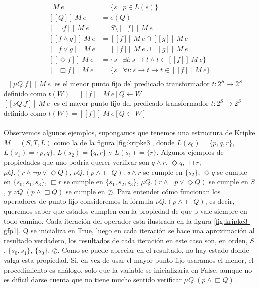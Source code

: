 \begin{align*}
 [[p]]\ M\ e &= \{s \mid p \in L(s)\}  \\
 [[Q]]\ M\ e &= e(Q) \\
 [[\neg f]]\ M\ e &= S \setminus [[f]]\ M\ e \\
 [[f \land g]]\ M\ e &= [[f]]\ M\ e \cap [[g]]\ M\ e \\
 [[f \lor g]]\ M\ e &= [[f]]\ M\ e \cup [[g]]\ M\ e \\
 [[\Diamond f]]\ M\ e &= \{s \mid \exists t : s \to t \land t \in [[f]]\ M\ e\} \\
 [[\Box f]]\ M\ e &= \{s \mid \forall t : s \to t  \rightarrow t \in [[f]]\ M\ e\} \\
\end{align*}
$[[\mu Q. f]] \ M\ e\ $ es el menor punto fijo del predicado transformador $t:2^{S} \to 2^{S}$ definido como $t(W) = [[f]]\ M\ e[Q \gets W] $ \\
$[[\nu Q. f]] \ M\ e\ $ es el mayor punto fijo del predicado transformador $t:2^{S} \to 2^{S}$ definido como $t(W) = [[f]]\ M\ e[Q \gets W] $ \\
\\
Observemos algunos ejemplos, supongamos que tenemos una estructura de Kripke $M = (S,T,L)$ como la de la figura \ref{fig:kripke3}, donde $L(s_{0}) = \{p,q,r\}$, $L(s_{1}) = \{p,q\}$, $L(s_{2}) = \{q,r\}$ y $L(s_{3}) = \{r\}$. Algunos ejemplos de propiedades que uno podria querer verificar son $q \land r$, $\Diamond q$, $\Box r$, $\mu Q. (r \land \neg p \lor \Diamond Q)$, $\nu Q. (p \land \Box Q)$. $q \land r$ se cumple en $\{s_{2}\}$, $\Diamond q$ se cumple en $\{s_{0},s_{1},s_{3}\}$, $\Box r$ se cumple en $\{s_{1},s_{2},s_{3}\}$, $\mu Q. (r \land \neg p \lor \Diamond Q)$ se cumple en $S$, y $\nu Q. (p \land \Box Q)$ se cumple en $\oslash$. Para entender cómo funcionan los operadores de punto fijo consideremos la fórmula $\nu Q. (p \land \Box Q)$, es decir, queremos saber que estados cumplen con la propiedad de que p vale siempre en todo camino. Cada iteración del operador esta ilustrada en la figura \ref{fig:kripke3-gfp1}. Q se inicializa en True, luego en cada iteración se hace una aproximación al resultado verdadero, los resultados de cada iteración en este caso son, en orden, $S$, $\{s_{0},s_{1}\}$, $\{s_{0}\}$, $\oslash$. Como se puede apreciar en el resultado, no hay estado donde valga esta propiedad. Si, en vez de usar el mayor punto fijo usaramos el menor, el procedimiento es análogo, solo que la variable se inicializaria en False, aunque no es dificil darse cuenta que no tiene mucho sentido verificar $\mu Q.(p \land \Box Q)$.

